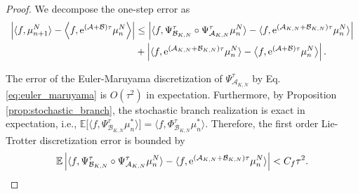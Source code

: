 \documentclass[preprint,12pt]{elsarticle}
\theoremstyle{definition}
\theoremstyle{remark}
\begin{document}
\begin{proof}
We decompose the one-step error as 
\[
\begin{split}
\left \vert \langle f,\mu_{n+1}^N\rangle
- \left\langle f, {\rm e}^{(\mathcal{A} + \mathcal{B})\tau} \mu_n^N\right\rangle \right \vert 
&\le   \left \vert \langle f,\Psi_{{\mathcal{B}}_{K,N}}^{\tau} \circ \Psi_{{\mathcal{A}}_{K,N}}^{\tau} \mu_{n}^N\rangle -  \langle f,{\rm e}^{(\mathcal{A}_{K,N} + \mathcal{B}_{K,N})\tau} \mu_{n}^N\rangle \right\vert   \\
&+ \left \vert \langle f, {\rm e}^{(\mathcal{A}_{K,N} + \mathcal{B}_{K,N})\tau} \mu_{n}^N\rangle - \big\langle f, {\rm e}^{(\mathcal{A} + \mathcal{B})\tau} \mu_n^N\big\rangle \right \vert .
\end{split}
\] 

The error of the Euler-Maruyama discretization of $\Psi_{{\mathcal{A}}_{K,N}}^{\tau}$ by Eq. \eqref{eq:euler_maruyama} is $O(\tau^2)$ in expectation. Furthermore, by Proposition \ref{prop:stochastic_branch}, the stochastic branch realization is exact in expectation, i.e.,  
$
\mathbb{E}\big[\langle f, \Psi_{{\mathcal{B}}_{K,N}}^{\tau} \mu_{n}^{\ast}\rangle\big] =  \langle f, \Phi_{{\mathcal{B}}_{K,N}}^{\tau} \mu_{n}^{\ast}\rangle 
$. Therefore,  the first order Lie-Trotter discretization error is bounded by
\begin{equation}
\mathbb{E} \left \vert \langle f,\Psi_{{\mathcal{B}}_{K,N}}^{\tau} \circ \Psi_{{\mathcal{A}}_{K,N}}^{\tau} \mu_{n}^N\rangle -  \langle f,{\rm e}^{(\mathcal{A}_{K,N} + \mathcal{B}_{K,N})\tau} \mu_{n}^N\rangle \right \vert < C_f \tau^2.
\label{eq:trotter_error}
\end{equation}


\end{proof}
\end{document}
